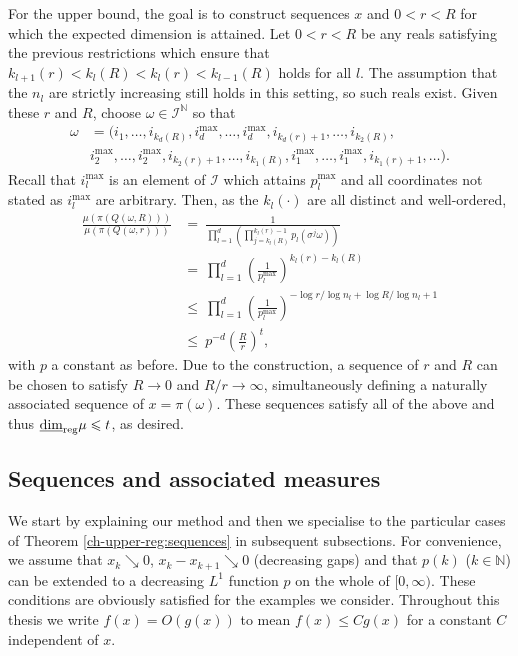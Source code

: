 For the upper bound, the goal is to construct sequences $x$ and $0 < r < R$ for which the expected dimension is attained. Let $0<r<R$ be any reals satisfying the previous restrictions which ensure that $ k_{l+1}(r)< k_l(R) < k_l(r) < k_{l-1}(R)$ holds for all $l$. The assumption that the $n_l$ are strictly increasing still holds in this setting, so such reals exist. Given these $r$ and $R$, choose $\omega \in \mathcal{I}^\mathbb{N}$ so that 
\begin{align*} 
\omega&= (i_1,\ldots, i_{k_d(R)}, i_d^{\text{max}},\ldots, i_d^{\text{max}}, i_{k_d(r)+1},\ldots, i_{k_2(R)},\\
&i_2^{\text{max}},\ldots , i_2^{\text{max}}, i_{k_2(r)+1},\ldots, i_{k_1(R)}, i_1^{\text{max}}, \ldots, i_1^{\text{max}}, i_{k_1(r)+1},\ldots).
\end{align*}
Recall that $i_l^{\text{max}}$ is an element of $\mathcal{I}$ which attains $p_l^{\text{max}}$ and all coordinates not stated as $i_l^{\text{max}}$ are arbitrary. Then, as the $k_l(\cdot)$ are all distinct and well-ordered,
\begin{align*}
\frac{\mu(\pi(Q(\omega,R)))}{\mu(\pi(Q(\omega,r)))}  & =\ \frac{1}{\prod_{l=1}^d\left(\prod_{j=k_l(R)}^{k_l(r)-1}p_l(\sigma^j \omega) \right)} \\
& = \ \prod_{l=1}^d\left( \frac{1}{p_l^{\text{max}}}\right)^{k_l(r)-k_l(R)}  \\
& \le\ \prod_{l=1}^d \left( \frac{1}{p_l^{\text{max}}}\right)^{-\log r/\log n_l + \log R/\log n_l + 1}  \\
& \le \ p^{-d} \left( \frac{R}{r} \right)^{t},
\end{align*}
with $p$ a constant as before. Due to the construction, a sequence of $r$ and $R$ can be chosen to satisfy $R \rightarrow 0$ and $R/r \rightarrow \infty$, simultaneously defining a naturally associated sequence of $x = \pi(\omega)$. These sequences satisfy all of the above and thus $\underline{\dim}_{\textup{reg}} \mu \leqslant t$, as desired.




\subsection{Sequences and associated measures}\label{ch-upper-reg:sequenceproof}



We start by explaining our method and then we specialise to the particular cases of  Theorem \ref{ch-upper-reg:sequences} in subsequent subsections.  For convenience, we assume that $x_k \searrow 0$, $x_k-x_{k+1} \searrow 0$ (decreasing gaps) and that $p(k)$ ($k \in \mathbb{N}$) can be extended to a decreasing $L^1$ function $p$ on the whole of $[0,\infty)$.  These conditions are obviously satisfied for the  examples we consider.  Throughout this thesis we write $f(x)=O(g(x))$ to mean $f(x) \le Cg(x)$ for a constant $C$ independent of $x$.

